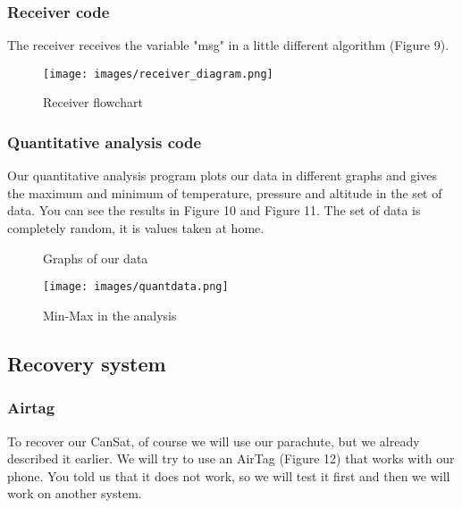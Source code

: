\documentclass[]{article}
\begin{document}
\subsubsection{Receiver code}

The receiver receives the variable "msg" in a little different algorithm (Figure 9).

\begin{figure}[h] 
    \centering
    \texttt{[image: images/receiver\_diagram.png]} 
    \caption{Receiver flowchart}
\end{figure}


\newpage
\subsubsection{Quantitative analysis code}

Our quantitative analysis program plots our data in different graphs and gives the maximum and minimum of temperature, pressure and altitude
in the set of data. You can see the results in Figure 10 and Figure 11. The set of data is completely random, it is values taken at home. 

\begin{figure}[h]
    \centering
    \hfill
    \hfill
    \caption{Graphs of our data}
\end{figure}

\begin{figure}[h] 
    \centering
    \texttt{[image: images/quantdata.png]} 
    \caption{Min-Max in the analysis}
\end{figure}

\subsection{Recovery system}

\subsubsection{Airtag}

To recover our CanSat, of course we will use our parachute, but we already described it earlier.
We will try to use an AirTag (Figure 12) that works with our phone. You told us that it does not work, so we will
test it first and then we will work on another system. 
\end{document}

